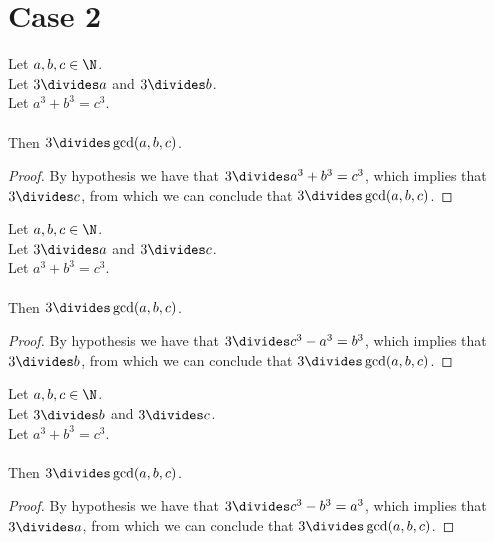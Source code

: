 \section{Case 2}

\begin{lemma}
  \label{lmm:three_dvd_gcd_of_dvd_a_of_dvd_b}
  \leanok
  Let $a, b, c \in \N$. \\
  Let $3 \divides a$ and $3 \divides b$. \\
  Let $a ^ 3 + b ^ 3 = c ^ 3$. \\\\
  Then $3 \divides \gcd(a,b,c)$.
\end{lemma}
\begin{proof}
  \leanok
  By hypothesis we have that $3 \divides a^3 + b^3 = c^3$, which implies that $3 \divides c$,
  from which we can conclude that $3 \divides \gcd(a,b,c)$.
\end{proof}

\begin{lemma}
  \label{lmm:three_dvd_gcd_of_dvd_a_of_dvd_c}
  \leanok
  Let $a, b, c \in \N$. \\
  Let $3 \divides a$ and $3 \divides c$. \\
  Let $a ^ 3 + b ^ 3 = c ^ 3$. \\\\
  Then $3 \divides \gcd(a,b,c)$.
\end{lemma}
\begin{proof}
  \leanok
  By hypothesis we have that $3 \divides c^3 - a^3 = b^3$, which implies that $3 \divides b$,
  from which we can conclude that $3 \divides \gcd(a,b,c)$.
\end{proof}

\begin{lemma}
  \label{lmm:three_dvd_gcd_of_dvd_b_of_dvd_c}
  \leanok
  Let $a, b, c \in \N$. \\
  Let $3 \divides b$ and $3 \divides c$. \\
  Let $a ^ 3 + b ^ 3 = c ^ 3$. \\\\
  Then $3 \divides \gcd(a,b,c)$.
\end{lemma}
\begin{proof}
  \leanok
  By hypothesis we have that $3 \divides c^3 - b^3 = a^3$, which implies that $3 \divides a$,
  from which we can conclude that $3 \divides \gcd(a,b,c)$.
\end{proof}


